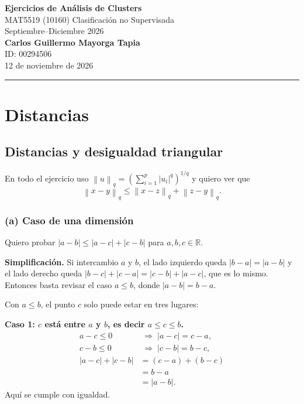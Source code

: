 \documentclass[11pt]{article}\usepackage[]{graphicx}\usepackage[]{xcolor}
\newcommand{\norm}[1]{\left\lVert #1 \right\rVert}
\begin{document}
\begin{center}
{\Large\bfseries Ejercicios de Análisis de Clusters}\\[4pt]
MAT5519 (10160) Clasificación no Supervisada\\
Septiembre--Diciembre 2026\\[10pt]
\textbf{Carlos Guillermo Mayorga Tapia}\\
ID: 00294506\\[4pt]
12 de noviembre de 2026
\end{center}

\vspace{6pt}
\hrule

\section{Distancias}
\subsection{Distancias y desigualdad triangular}

En todo el ejercicio uso $\norm{u}_q = \left(\sum_{i=1}^p |u_i|^q\right)^{1/q}$ y quiero ver que
\[
\norm{x-y}_q \le \norm{x-z}_q + \norm{z-y}_q .
\]

\subsubsection*{(a) Caso de una dimensión}

Quiero probar $|a-b| \le |a-c| + |c-b|$ para $a,b,c\in\mathbb{R}$.

\textbf{Simplificación.} Si intercambio $a$ y $b$, el lado izquierdo queda $|b-a| = |a-b|$ y el lado derecho queda $|b-c|+|c-a| = |c-b| + |a-c|$, que es lo mismo. Entonces basta revisar el caso $a \le b$, donde $|a-b| = b-a$.

Con $a\le b$, el punto $c$ solo puede estar en tres lugares:

\textbf{Caso 1: $c$ está entre $a$ y $b$, es decir $a \le c \le b$.}
\begin{align*}
a - c \le 0 &\;\Rightarrow\; |a-c| = c-a,\\
c - b \le 0 &\;\Rightarrow\; |c-b| = b-c,\\
|a-c| + |c-b| &= (c-a) + (b-c)\\
&= b - a\\
&= |a-b|.
\end{align*}
Aquí se cumple con igualdad.
\end{document}
